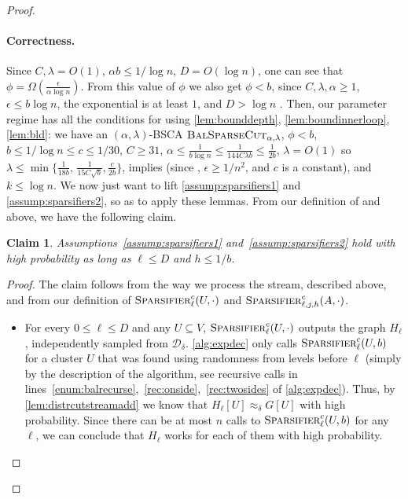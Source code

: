 \documentclass[epsfig,letter,11pt]{article}
\numberwithin{equation}{section}
\newcommand{\bsc}{\textsc{BalSparseCut}_{\alpha,\lambda}}
\newtheorem{claim}[theorem]{Claim}
\begin{document}
\begin{proof}
	\paragraph{Correctness.} Since $C,\lambda = O(1)$, $\alpha b \le 1/\log n$, $D = O(\log n)$, one can see that $\phi= \Omega(\frac{\epsilon}{\alpha \log n})$. From this value of $\phi$ we also get $\phi < b$, since $C,\lambda,\alpha \ge 1$, $\epsilon \le b \log n$, the exponential is at least $1$, and $D > \log n$ . Then, our parameter regime has all the conditions for using \cref{lem:bounddepth}, \cref{lem:boundinnerloop}, \cref{lem:bld}: we have an $(\alpha,\lambda)$-BSCA $\bsc$, $\phi < b$, $b \le 1/\log n \le c \le 1/30$, $C \ge 31$, $\alpha \le \frac{1}{b \log n} \le \frac{1}{144C \lambda b} \le \frac{1}{2b}$, $\lambda = O(1)$ so $\lambda \le \min\{\frac{1}{18b}, \, \frac{1}{15C\sqrt{b}}, \frac{c}{2b}\}$,   implies  (since , $\epsilon \ge 1/n^2$, and $c$ is a constant), and $k \le \log n$. We now just want to lift \cref{assump:sparsifiers1} and \cref{assump:sparsifiers2}, so as to apply these lemmas. From our definition of  and  above, we have the following claim.
	\begin{claim}
		\label{claim:lift}
		Assumptions~\ref{assump:sparsifiers1} and~\ref{assump:sparsifiers2} hold with high probability as long as $\ell \le D$ and $h \le 1/b$.
	\end{claim}
	\begin{proof}
		The claim follows from the way we process the stream, described above, and from our definition of $\textsc{Sparsifier}^c_\ell(U,\cdot)$ and $\textsc{Sparsifier}^c_{\ell,j,h}(A,\cdot)$.
		\begin{itemize}
			\item For every $0 \le \ell \le D$ and any $U \subseteq V$, $\textsc{Sparsifier}^c_\ell(U,\cdot)$ outputs the graph $H_\ell$, independently sampled from $\mathcal{D}_\delta$.  \cref{alg:expdec} only calls $\textsc{Sparsifier}^c_\ell(U,b)$ for a cluster $U$ that was found using randomness from levels before $\ell$ (simply by the description of the algorithm, see recursive calls in lines~\eqref{enum:balrecurse},~\eqref{rec:onside},~\eqref{rec:twosides} of \cref{alg:expdec}). Thus, by \cref{lem:distrcutstreamadd} we know that $H_\ell[U] \approx_\delta G[U]$ with high probability. Since there can be at most $n$ calls to $\textsc{Sparsifier}^c_\ell(U,b)$ for any $\ell$, we can conclude that $H_\ell$ works for each of them with high probability.

\end{itemize}
\end{proof}
\end{proof}
\end{document}
